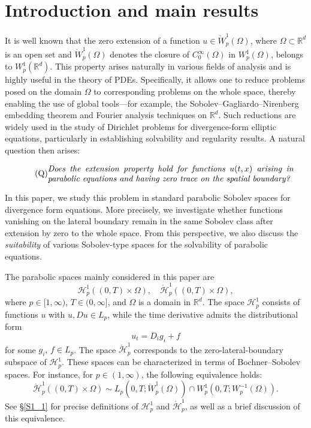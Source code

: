 \documentclass[reqno]{amsart}
\numberwithin{equation}{section}
\theoremstyle{plain}
\theoremstyle{definition}
\def\bR{\mathbb{R}}
\def\cH{\mathcal{H}}
\begin{document}
\section{Introduction and main results}	\label{S1}

It is well known that the zero extension of a function $u \in \mathring{W}_p^1(\Omega)$, where $\Omega \subset \bR^d$ is an open set and $\mathring{W}_p^1(\Omega)$ denotes the closure of $C_0^\infty(\Omega)$ in $W_p^1(\Omega)$, belongs to $W_p^1(\bR^d)$.
This property arises naturally in various fields of analysis and is highly useful in the theory of PDEs.
Specifically, it allows one to reduce problems posed on the domain $\Omega$ to corresponding problems on the whole space, thereby enabling the use of global tools---for example, the Sobolev--Gagliardo--Nirenberg embedding theorem and Fourier analysis techniques on $\bR^d$.
Such reductions are widely used in the study of Dirichlet problems for divergence-form elliptic equations, particularly in establishing solvability and regularity results.
A natural question then arises: 

\medskip

\begin{equation}
\tag{Q}
\label{main_question}
\begin{minipage}{0.85\textwidth}
\itshape
Does the extension property hold for functions $u(t,x)$ arising in parabolic equations and having zero trace on the spatial boundary?
\end{minipage}
\end{equation}

\medskip

In this paper, we study this problem in standard parabolic Sobolev spaces for divergence form equations.
More precisely, we investigate whether functions vanishing on the lateral boundary remain in the same Sobolev class after extension by zero to the whole space.
From this perspective, we also discuss the \emph{suitability} of various Sobolev-type spaces for the solvability of parabolic equations.

The parabolic spaces mainly considered in this paper are 
$$
\cH^1_p((0,T)\times \Omega),  \quad \mathring{\cH}^1_p((0,T)\times \Omega),
$$
where $p\in [1, \infty)$, $T\in (0, \infty]$, and $\Omega$ is a domain in $\bR^d$.
The space $\cH^1_p$ consists of functions $u$ with $u, Du\in L_p$, while the time derivative admits the distributional form
\begin{equation}		\label{260226_eq1}
u_t=D_i g_i+f
\end{equation}
for some $g_i, \, f\in L_p$.
The space $\mathring{\cH}^1_p$ corresponds to the zero-lateral-boundary subspace of $\cH^1_p$.
These spaces can be characterized in terms of Bochner--Sobolev spaces.
For instance, for $p\in (1, \infty)$, the following equivalence holds: 
$$
\mathring{\cH}^1_p((0,T)\times \Omega) \sim L_p(0,T; \mathring{W}^1_p(\Omega))\cap W^1_p(0,T; W^{-1}_p(\Omega)).
$$
See \S \ref{S1_1} for precise definitions of $\cH^1_p$ and $\mathring{\cH}^1_p$, as well as a brief discussion of this equivalence.
\end{document}
